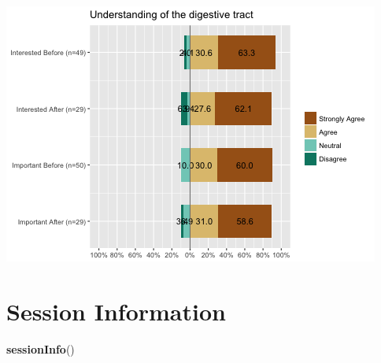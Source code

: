 \documentclass[]{article}
\newenvironment{Shaded}{\begin{snugshade}}{\end{snugshade}}
\newcommand{\KeywordTok}[1]{\textcolor[rgb]{0.13,0.29,0.53}{\textbf{{#1}}}}
\newcommand{\NormalTok}[1]{{#1}}
\begin{document}
\includegraphics{figures/interests-2.png}

\section{Session Information}\label{session-information}

\begin{Shaded}
\begin{Highlighting}[]
\KeywordTok{sessionInfo}\NormalTok{()}
\end{Highlighting}
\end{Shaded}
\end{document}
